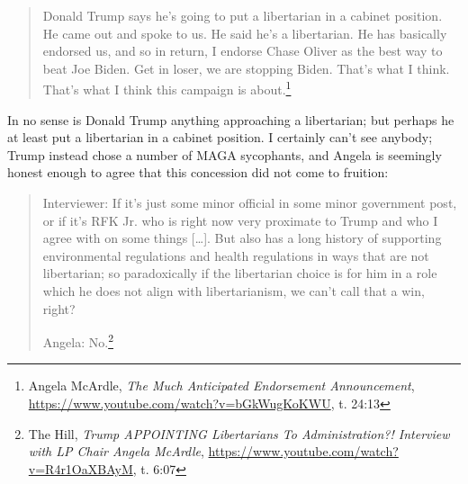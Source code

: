 \documentclass[11pt]{article}
\begin{document}
\begin{quote}
Donald Trump says he's going to put a libertarian in a cabinet position. He came out and spoke to us. He said he's a libertarian. He has basically endorsed us, and so in return, I endorse Chase Oliver as the best way to beat Joe Biden. Get in loser, we are stopping Biden. That's what I think. That's what I think this campaign is about.\footnote{Angela McArdle, \emph{The Much Anticipated Endorsement Announcement}, \url{https://www.youtube.com/watch?v=bGkWugKoKWU}, t. 24:13}
\end{quote}

In no sense is Donald Trump anything approaching a libertarian; but perhaps he at least put a libertarian in a cabinet position. I certainly can't see anybody; Trump instead chose a number of MAGA sycophants, and Angela is seemingly honest enough to agree that this concession did not come to fruition:

\begin{quote}
Interviewer: If it's just some minor official in some minor government post, or if it's RFK Jr. who is right now very proximate to Trump and who I agree with on some things [\ldots{}]. But also has a long history of supporting environmental regulations and health regulations in ways that are not libertarian; so paradoxically if the libertarian choice is for him in a role which he does not align with libertarianism, we can't call that a win, right?

Angela: No.\footnote{The Hill, \emph{Trump APPOINTING Libertarians To Administration?! Interview with LP Chair Angela McArdle}, \url{https://www.youtube.com/watch?v=R4r1OaXBAyM}, t. 6:07}
\end{quote}
\end{document}
